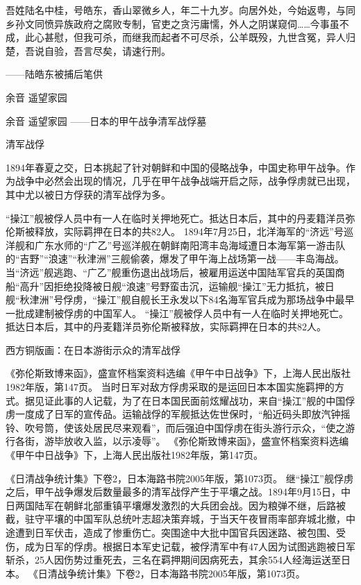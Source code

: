 \documentclass[12pt,UTF8]{ctexbook}
\begin{document}
吾姓陆名中桂，号皓东，香山翠微乡人，年二十九岁。向居外处，今始返粤，与同乡孙文同愤异族政府之腐败专制，官吏之贪污庸懦，外人之阴谋窥伺……今事虽不成，此心甚慰，但我可杀，而继我而起者不可尽杀，公羊既殁，九世含冤，异人归楚，吾说自验，吾言尽矣，请速行刑。

——陆皓东被捕后笔供

\backmatter

余音 遥望家园

余音
遥望家园
——日本的甲午战争清军战俘墓

清军战俘

1894年春夏之交，日本挑起了针对朝鲜和中国的侵略战争，中国史称甲午战争。作为战争中必然会出现的情况，几乎在甲午战争战端开启之际，战争俘虏就已出现，其中尤以被日方俘获的清军战俘为多。

“操江”舰被俘人员中有一人在临时关押地死亡。抵达日本后，其中的丹麦籍洋员弥伦斯被释放，实际羁押在日本的共82人。
1894年7月25日，北洋海军的“济远”号巡洋舰和广东水师的“广乙”号巡洋舰在朝鲜南阳湾丰岛海域遭日本海军第一游击队的“吉野”“浪速”“秋津洲”三舰偷袭，爆发了甲午海上战场第一战——丰岛海战。当“济远”舰逃跑、“广乙”舰重伤退出战场后，被雇用运送中国陆军官兵的英国商船“高升”因拒绝投降被日舰“浪速”号野蛮击沉，运输舰“操江”无力抵抗，被日舰“秋津洲”号俘虏，“操江”舰自舰长王永发以下84名海军官兵成为那场战争中最早一批成建制被俘虏的中国军人。 “操江”舰被俘人员中有一人在临时关押地死亡。抵达日本后，其中的丹麦籍洋员弥伦斯被释放，实际羁押在日本的共82人。


西方铜版画：在日本游街示众的清军战俘

《弥伦斯致博来函》，盛宣怀档案资料选编《甲午中日战争》下，上海人民出版社1982年版，第147页。
当时日军对敌方俘虏采取的是运回日本本国实施羁押的方式。据见证此事的人记载，为了在日本国民面前炫耀战功，来自“操江”舰的中国俘虏一度成了日军的宣传品。运输战俘的军舰抵达佐世保时，“船近码头即放汽钟摇铃、吹号筒，使该处居民尽来观看”，而后强迫中国俘虏在街头游行示众，“使之游行各街，游毕放收入监，以示凌辱”。 《弥伦斯致博来函》，盛宣怀档案资料选编《甲午中日战争》下，上海人民出版社1982年版，第147页。

《日清战争统计集》下卷2，日本海路书院2005年版，第1073页。
继“操江”舰俘虏之后，甲午战争爆发后数量最多的清军战俘产生于平壤之战。1894年9月15日，中日两国陆军在朝鲜北部重镇平壤爆发激烈的大兵团会战。因为粮弹不继，后路被截，驻守平壤的中国军队总统叶志超决策弃城，于当天午夜冒雨率部弃城北撤，中途遭到日军伏击，造成了惨重伤亡。突围途中大批中国官兵因迷路、被包围、受伤，成为日军的俘虏。根据日本军史记载，被俘清军中有47人因为试图逃跑被日军斩杀，25人因伤势过重死去，三名在羁押期间因病死去，其余554人经海运送至日本。 《日清战争统计集》下卷2，日本海路书院2005年版，第1073页。
\end{document}
